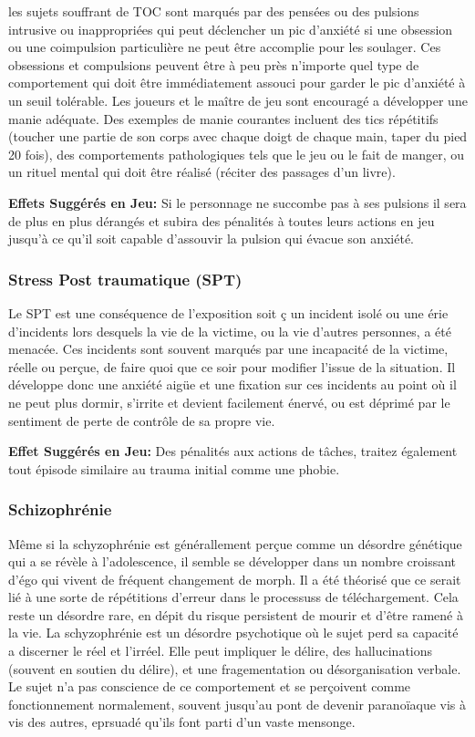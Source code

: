 les sujets souffrant de TOC sont marqués par des pensées ou des pulsions intrusive ou inappropriées qui peut déclencher un pic d'anxiété si une obsession ou une coimpulsion particulière ne peut être accomplie pour les soulager. Ces obsessions et compulsions peuvent être à peu près n'importe quel type de comportement qui doit être immédiatement assouci pour garder le pic d'anxiété à un seuil tolérable. Les joueurs et le maître de jeu sont encouragé a développer une manie adéquate. Des exemples de manie courantes incluent des tics répétitifs (toucher une partie de son corps avec chaque doigt de chaque main, taper du pied 20 fois), des comportements pathologiques tels que le jeu ou le fait de manger, ou un rituel mental qui doit être réalisé (réciter des passages d'un livre). 

\textbf{Effets Suggérés en Jeu:} Si le personnage ne succombe pas à ses pulsions il sera de plus en plus dérangés et subira des pénalités à toutes leurs actions en jeu jusqu'à ce qu'il soit capable d'assouvir la pulsion qui évacue son anxiété. 

\subsubsection{Stress Post traumatique (SPT)} 

Le SPT est une conséquence de l'exposition soit ç un incident isolé ou une érie d'incidents lors desquels la vie de la victime, ou la vie d'autres personnes, a été menacée. Ces incidents sont souvent marqués par une incapacité de la victime, réelle ou perçue, de faire quoi que ce soir pour modifier l'issue de la situation. Il développe donc une anxiété aigüe et une fixation sur ces incidents au point où il ne peut plus dormir, s'irrite et devient facilement énervé, ou est déprimé par le sentiment de perte de contrôle de sa propre vie. 

\textbf{Effet Suggérés en Jeu:} Des pénalités aux actions de tâches, traitez également tout épisode similaire au trauma initial comme une phobie. 

\subsubsection{Schizophrénie} 

Même si la schyzophrénie est générallement perçue comme un désordre génétique qui a se révèle à l'adolescence, il semble se développer dans un nombre croissant d'égo qui vivent de fréquent changement de morph. Il a été théorisé que ce serait lié à une sorte de répétitions d'erreur dans le processuss de téléchargement. Cela reste un désordre rare, en dépit du risque persistent de mourir et d'être ramené à la vie. La schyzophrénie est un désordre psychotique où le sujet perd sa capacité a discerner le réel et l'irréel. Elle peut impliquer le délire, des hallucinations (souvent en soutien du délire), et une fragementation ou désorganisation verbale. Le sujet n'a pas conscience de ce comportement et se perçoivent comme fonctionnement normalement, souvent jusqu'au pont de devenir paranoïaque vis à vis des autres, eprsuadé qu'ils font parti d'un vaste mensonge. 

